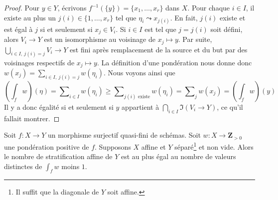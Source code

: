 \begin{proof}
\medskip\noindent
Pour $y \in Y$, écrivons $f^{-1}(\{y\}) = \{x_1, \ldots, x_r\}$ dans $X$.
Pour chaque $i \in I$, il existe au plus un $j(i) \in \{1, \ldots, x_r\}$
tel que $\eta_i \leadsto x_{j(i)}$. En fait, $j(i)$ existe et est
égal à $j$ si et seulement si $x_j \in V_i$. Si $i \in I$ est tel que
$j = j(i)$ soit défini, alors $V_i \to Y$ est un isomorphisme au voisinage
de $x_j \mapsto y$. Par suite, $\bigcup_{i \in I,\ j(i) = j} V_i \to Y$
est fini après remplacement de la source et du but par des voisinages respectifs de
$x_j \mapsto y$. La définition d'une pondération nous donne donc
$w(x_j) = \sum_{i \in I,\ j(i) = j} w(\eta_i)$.
Nous voyons ainsi que
$$
(\textstyle{\int}_f w)(\eta) =
\sum\nolimits_{i \in I} w(\eta_i) \geq
\sum\nolimits_{j(i)\text{ existe}} w(\eta_i) =
\sum\nolimits_j w(x_j) = (\textstyle{\int}_f w)(y)
$$
Il y a donc égalité si et seulement si $y$ appartient à
$\bigcap_{i \in I} \Im(V_i \to Y)$, ce qu'il fallait montrer.
\end{proof}

\begin{proposition}
\label{proposition-asn-weighting}
Soit $f : X \to Y$ un morphisme surjectif quasi-fini de schémas.
Soit $w : X \to \mathbf{Z}_{> 0}$ une pondération positive de $f$.
Supposons $X$ affine et $Y$ séparé\footnote{Il suffit que la
diagonale de $Y$ soit affine.} et non vide. Alors le nombre de stratification
affine de $Y$ est au plus égal au nombre de valeurs distinctes de $\int_f w$
moins $1$.
\end{proposition}

